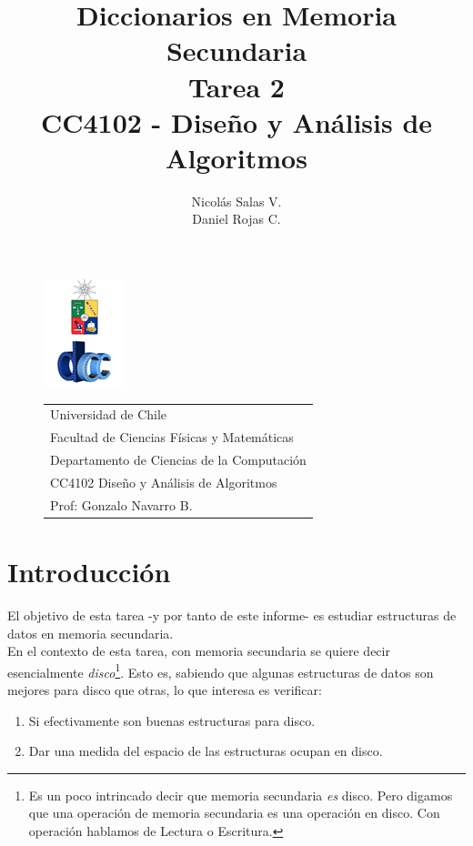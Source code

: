 \documentclass[12pt,letterpaper]{report}
\title{\Huge Diccionarios en Memoria Secundaria \\ Tarea 2 \\ CC4102 - Diseño y Análisis de Algoritmos}
\author{Nicolás Salas V.\\Daniel Rojas C.}
\begin{document}
\pagestyle{empty}
\begin{figure}[t]
\includegraphics[scale=0.83]{logo.png}
\begin{tabular}{l}
\small Universidad de Chile\\
\small Facultad de Ciencias Físicas y Matemáticas\\
\small Departamento de Ciencias de la Computación\\
\small CC4102 Diseño y Análisis de Algoritmos\\
\small Prof: Gonzalo Navarro B.
\vspace{2.3cm}
\end{tabular}
\end{figure}

\maketitle

\tableofcontents
\newpage

\section{Introducción}

El objetivo de esta tarea -y por tanto de este informe- es estudiar estructuras de datos en memoria secundaria.\\

En el contexto de esta tarea, con memoria secundaria se quiere decir esencialmente \emph{disco}\footnote{Es un poco intrincado decir que memoria secundaria \emph{es} disco. Pero digamos que una operación de memoria secundaria es una operación en disco. Con operación hablamos de Lectura o Escritura.}. Esto es, sabiendo que algunas estructuras de datos son mejores para disco que otras, lo que interesa es verificar:

\begin{enumerate}
\item Si efectivamente son buenas estructuras para disco.
\item Dar una medida del espacio de las estructuras ocupan en disco.
\end{enumerate}
\end{document}
